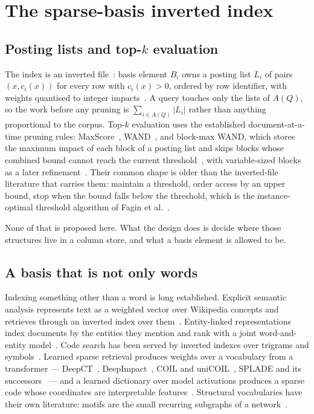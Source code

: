 \section{The sparse-basis inverted index}
\label{sec:index}

\subsection{Posting lists and top-\texorpdfstring{$k$}{k} evaluation}

\prior{} The index is an inverted file~\cite{zobel2006inverted}: basis element
$B_i$ owns a posting list $L_i$ of pairs $(x, c_i(x))$ for every row with
$c_i(x) > 0$, ordered by row identifier, with weights quantised to integer
impacts~\cite{anh2002impact}. A query touches only the lists of $A(Q)$, so the
work before any pruning is $\sum_{i \in A(Q)} |L_i|$ rather than anything
proportional to the corpus. Top-$k$ evaluation uses the established
document-at-a-time pruning rules: MaxScore~\cite{turtle1995maxscore},
WAND~\cite{broder2003wand}, and block-max WAND, which stores the maximum impact
of each block of a posting list and skips blocks whose combined bound cannot
reach the current threshold~\cite{ding2011bmw}, with variable-sized blocks as a
later refinement~\cite{mallia2017vbmw}. Their common shape is older than the
inverted-file literature that carries them: maintain a threshold, order access
by an upper bound, stop when the bound falls below the threshold, which is the
instance-optimal threshold algorithm of Fagin et al.~\cite{fagin2003ta}.

None of that is proposed here. What the design does is decide where those
structures live in a column store, and what a basis element is allowed to be.

\subsection{A basis that is not only words}

\prior{} Indexing something other than a word is long established. Explicit
semantic analysis represents text as a weighted vector over Wikipedia concepts
and retrieves through an inverted index over
them~\cite{gabrilovich2007esa}. Entity-linked representations index documents
by the entities they mention and rank with a joint word-and-entity
model~\cite{xiong2017duet,dalton2014entity}. Code search has been served by
inverted indexes over trigrams and symbols~\cite{cox2012trigram}. Learned
sparse retrieval produces weights over a vocabulary from a transformer ---
DeepCT~\cite{dai2020deepct}, DeepImpact~\cite{mallia2021deepimpact},
COIL and uniCOIL~\cite{gao2021coil,lin2021unicoil}, SPLADE and its
successors~\cite{formal2021splade,formal2021spladev2,formal2022spladepp} ---
and a learned dictionary over model activations produces a sparse code whose
coordinates are interpretable features~\cite{olshausen1996sparse,cunningham2023sae}.
Structural vocabularies have their own literature: motifs are the small
recurring subgraphs of a network~\cite{milo2002motifs}.

